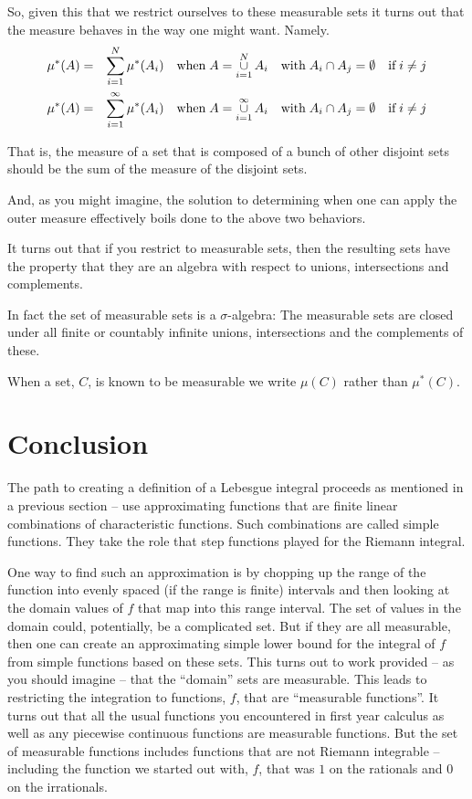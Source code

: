 \documentclass{article}
\begin{document}
So, given this that we restrict ourselves to these measurable sets it turns out that
the measure behaves in the way one might want. Namely.
\begin{eqnarray*}
	\mu^*(A) & = & \sum_{i=1}^N\limits \mu^*(A_i) \quad \text{when} \; A = \mathop{\cup}_{i=1}^N\limits A_i \quad \text{with} \;  A_i \cap A_j = \emptyset \quad \text{if} \; i \neq j \\
	\mu^*(A) & = & \sum_{i=1}^\infty\limits \mu^*(A_i) \quad \text{when} \; A = \mathop{\cup}_{i=1}^\infty\limits A_i \quad \text{with} \; A_i \cap A_j = \emptyset \quad \text{if} \; i \neq j
\end{eqnarray*}

That is, the measure of a set that is composed of a bunch of other disjoint 
sets should be the sum of the measure of the disjoint sets.

And, as you might imagine, the solution to determining when one can apply the 
outer measure effectively boils done to the above two behaviors.

It turns out that if you restrict to measurable sets, 
then the resulting sets have the property that they are an 
algebra with respect to unions, intersections and complements. 

In fact the set of measurable sets is a $\sigma$-algebra:
The measurable sets are closed under all finite or countably infinite unions, intersections and the complements of these.

When a set, $C$, is known to be measurable we write $\mu(C)$ rather than $\mu^*(C)$.

\section{Conclusion}

The path to creating a definition of a Lebesgue integral proceeds as mentioned 
in a previous section -- use approximating functions that are finite linear
combinations of characteristic functions. Such combinations are called simple 
functions. They take the role that step functions played for the Riemann integral. 

One way to find such an approximation is by chopping up the range of the function 
into evenly spaced (if the range is finite) intervals and then looking at the 
domain values of $f$ that map into this range interval. The set of values in 
the domain could, potentially, be a complicated set. But if they are all measurable, then 
one can create an approximating simple lower bound for the integral of $f$ 
from simple functions based on these sets. This turns out to work provided -- 
as you should imagine -- that the ``domain'' sets are measurable. This leads to 
restricting the integration to functions, $f$, that are ``measurable functions''. 
It turns out that all the usual functions you encountered in first year 
calculus as well as any piecewise continuous functions are measurable functions. 
But the set of measurable functions includes functions that are
not Riemann integrable -- including the function we started out with, $f$, that
was $1$ on the rationals and $0$ on the irrationals.
\end{document}
